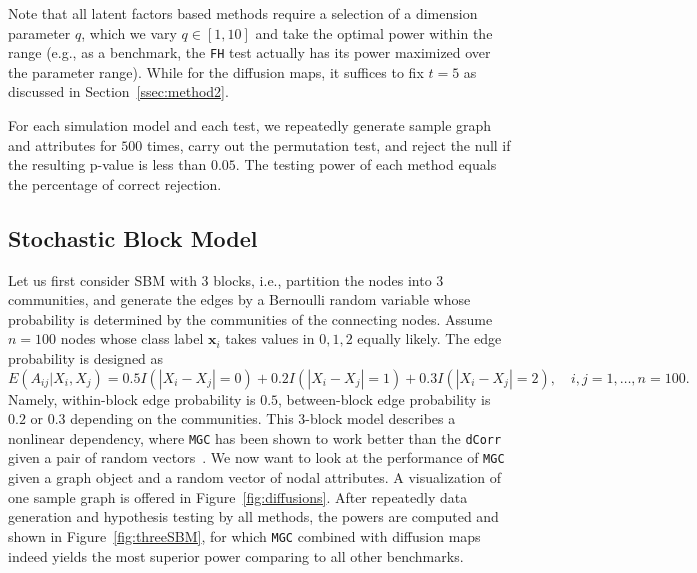 \documentclass[11pt]{article}
\theoremstyle{definition}
\begin{document}
Note that all latent factors based methods require a selection of a dimension parameter $q$, which we vary $q \in [1,10]$ and take the optimal power within the range (e.g., as a benchmark, the \texttt{FH} test actually has its power maximized over the parameter range). While for the diffusion maps, it suffices to fix $t=5$ as discussed in Section~\ref{ssec:method2}.

For each simulation model and each test, we repeatedly generate sample graph and attributes for $500$ times, carry out the permutation test, and reject the null if the resulting p-value is less than $0.05$. The testing power of each method equals the percentage of correct rejection. 

\subsection{Stochastic Block Model}

Let us first consider SBM with $3$ blocks, i.e., partition the nodes into $3$ communities, and generate the edges by a Bernoulli random variable whose probability is determined by the communities of the connecting nodes. Assume $n=100$ nodes whose class label $\mathbf{x}_i$ takes values in $0,1,2$ equally likely. The edge probability is designed as
\begin{equation}
\label{eq:Three}
E(A_{ij} | X_{i}, X_{j}) = 0.5 I(|X_{i} - X_{j}| = 0) + 0.2 I(|X_{i} - X_{j}| = 1) + 0.3 I(|X_{i} - X_{j}| = 2), \quad i,j = 1, \ldots, n = 100.
\end{equation} 
Namely, within-block edge probability is $0.5$, between-block edge probability is $0.2$ or $0.3$ depending on the communities. This 3-block model describes a nonlinear dependency, where \texttt{MGC} has been shown to work better than the \texttt{dCorr} given a pair of random vectors~\cite{shen2016discovering}. We now want to look at the performance of \texttt{MGC} given a graph object and a random vector of nodal attributes. A visualization of one sample graph is offered in Figure~\ref{fig:diffusions}. After repeatedly data generation and hypothesis testing by all methods, the powers are computed and shown in Figure~\ref{fig:threeSBM}, for which \texttt{MGC} combined with diffusion maps indeed yields the most superior power comparing to all other benchmarks.
\end{document}
